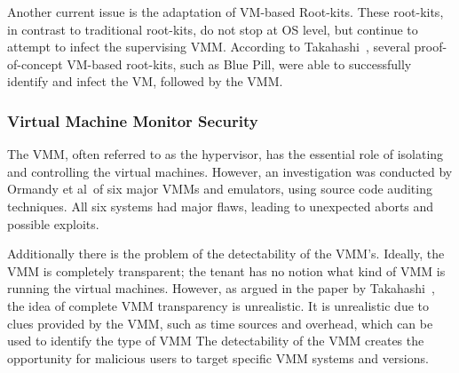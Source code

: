 Another current issue is the adaptation of VM-based Root-kits. 
These root-kits, in contrast to traditional root-kits, do not stop at OS level, but continue to attempt to infect the supervising \ac{VMM}. 
According to Takahashi~\cite{Takahashi2012Security}, several proof-of-concept VM-based root-kits, such as Blue Pill, were able to successfully identify and infect the VM, followed by the \ac{VMM}.

\subsubsection{Virtual Machine Monitor Security}
The \acl{VMM}, often referred to as the hypervisor, has the essential role of isolating and controlling the virtual machines. 
However, an investigation was conducted by Ormandy et al~\cite{Ormandy2007Security}of six major \acp{VMM} and emulators, using source code auditing techniques. All six systems had major flaws, leading to unexpected aborts and possible exploits.

Additionally there is the problem of the detectability of the \ac{VMM}’s. Ideally, the \ac{VMM} is completely transparent; the tenant has no notion what kind of \ac{VMM} is running the virtual machines. 
However, as argued in the paper by Takahashi~\cite{Takahashi2012Security}, the idea of complete \ac{VMM} transparency is unrealistic. 
It is unrealistic due to clues provided by the \ac{VMM}, such as time sources and overhead, which can be used to identify the type of \ac{VMM}
The detectability of the \ac{VMM} creates the opportunity for malicious users to target specific \ac{VMM} systems and versions.


